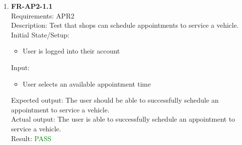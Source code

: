\documentclass[12pt, titlepage]{article}
\newcommand{\testpass}{\textcolor{green}{PASS}}
\begin{document}
\begin{enumerate}
                    
                \item \textbf{FR-AP2-1.1} \label{FR-AP2-1.1} \\ Requirements: APR2 \\
                    Description: Test that shops can schedule appointments to service a vehicle. \\
                    Initial State/Setup: \begin{itemize}
                        \item User is logged into their account
                    \end{itemize}
                    Input: \begin{itemize}
                        \item User selects an available appointment time
                    \end{itemize}
                    Expected output: The user should be able to successfully schedule an appointment to service a vehicle. \\
                    Actual output: The user is able to successfully schedule an appointment to service a vehicle. \\
                    Result: \testpass 
                    
                    
                    

\end{enumerate}
\end{document}
